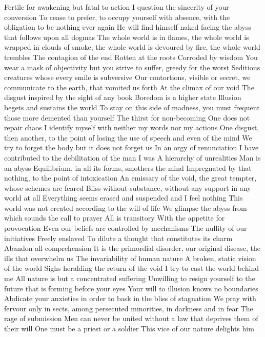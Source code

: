 \documentclass{article}
\begin{document}
Fertile for awakening but fatal to action
I question the sincerity of your conversion
To cease to prefer, to occupy yourself with absence, with the obligation to be nothing ever again
He will find himself naked facing the abyss that follows upon all dogmas
The whole world is in flames, the whole world is wrapped in clouds of smoke, the whole world is devoured by fire, the whole world trembles
The contagion of the end
Rotten at the roots
Corroded by wisdom
You wear a mask of objectivity but you strive to suffer, greedy for the worst
Seditious creatures whose every smile is subversive
Our contortions, visible or secret, we communicate to the earth, that vomited us forth
At the climax of our void
The disgust inspired by the sight of any book
Boredom is a higher state
Illusion begets and sustains the world
To stay on this side of madness, you must frequent those more demented than yourself
The thirst for non-becoming
One does not repair chaos
I identify myself with neither my words nor my actions
One disgust, then another, to the point of losing the use of speech and even of the mind
We try to forget the body but it does not forget us
In an orgy of renunciation
I have contributed to the debilitation of the man I was
A hierarchy of unrealities
Man is an abyss
Equilibrium, in all its forms, smothers the mind
Impregnated by that nothing, to the point of intoxication
An emissary of the void, the great tempter, whose schemes are feared
Bliss without substance, without any support in any world at all
Everything seems erased and suspended and I feel nothing
This world was not created according to the will of life
We glimpse the abyss from which sounds the call to prayer
All is transitory
With the appetite for provocation
Even our beliefs are controlled by mechanisms
The nullity of our initiatives
Freely enslaved
To dilute a thought that constitutes its charm
Abandon all comprehension
It is the primordial disorder, our original disease, the ills that overwhelm us
The invariability of human nature
A broken, static vision of the world
Sighs heralding the return of the void
I try to cast the world behind me
All nature is but a concentrated suffering
Unwilling to resign yourself to the future that is forming before your eyes
Your will to illusion knows no boundaries
Abdicate your anxieties in order to bask in the bliss of stagnation
We pray with fervour only in sects, among persecuted minorities, in darkness and in fear
The rage of submission
Men can never be united without a law that deprives them of their will
One must be a priest or a soldier
This vice of our nature delights him
\end{document}
